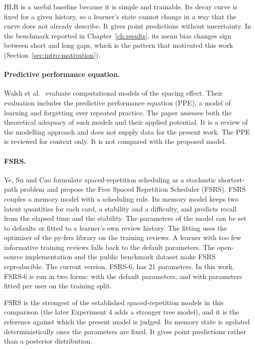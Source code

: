 HLR is a useful baseline because it is simple and trainable. Its decay curve is fixed for a given
history, so a learner's state cannot change in a way that the curve does not already describe. It gives
point predictions without uncertainty. In the benchmark reported in Chapter~\ref{ch:results}, its
mean bias changes sign between short and long gaps, which is the pattern that motivated this work
(Section~\ref{sec:intro-motivation}).

\paragraph{Predictive performance equation.}
Walsh et al.\ \cite{walsh2018ppe} evaluate computational models of the spacing effect. Their
evaluation includes the predictive performance equation (PPE), a model of learning and forgetting
over repeated practice. The paper assesses both the theoretical adequacy of such models and their
applied potential. It is a review of the modelling approach and does not supply data for the present
work. The PPE is reviewed for context only. It is not compared with the proposed model.

\paragraph{FSRS.}
Ye, Su and Cao \cite{ye2022stochastic} formulate spaced-repetition scheduling as a stochastic
shortest-path problem and propose the Free Spaced Repetition Scheduler (FSRS). FSRS couples a memory
model with a scheduling rule. Its memory model keeps two latent quantities for each card, a
stability and a difficulty, and predicts recall from the elapsed time and the stability. The parameters
of the model can be set to defaults or fitted to a learner's own review history. The fitting uses the
optimiser of the py-fsrs library on the training reviews. A learner with too few informative training
reviews falls back to the default parameters. The open-source
implementation \cite{pyfsrs} and the public benchmark dataset \cite{ankirevlogs10k} make FSRS
reproducible. The current version, FSRS-6, has 21 parameters. In this work, FSRS-6 is run in two
forms: with the default parameters, and with parameters fitted per user on the training split.

FSRS is the strongest of the established spaced-repetition models in this comparison (the later Experiment 4 adds a stronger tree model), and it is the reference against which the present
model is judged. Its memory state is updated deterministically once the parameters are fixed. It gives
point predictions rather than a posterior distribution.

